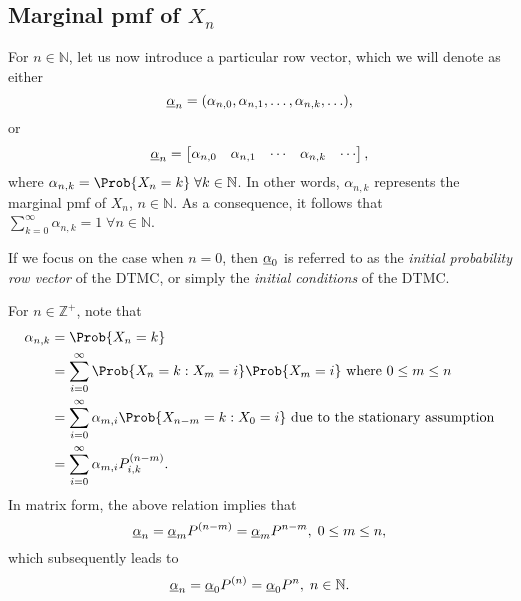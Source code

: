 \subsection*{Marginal pmf of $ X_n $}
\begin{Regular}
    For $ n\in\mathbb{N} $, let us now introduce a particular row vector, which we will denote as either
    \[ \underline{\alpha}_n=(\alpha_{n,0},\alpha_{n,1},\ldots,\alpha_{n,k},\ldots), \]
    or
    \[ \underline{\alpha}_n=\begin{bmatrix}
            \alpha_{n,0} & \alpha_{n,1} & \cdots & \alpha_{n,k} & \cdots
        \end{bmatrix}, \]
    where $ \alpha_{n,k}=\Prob{X_n=k}\; \forall k\in\mathbb{N} $. In other words, $ \alpha_{n,k} $ represents the marginal pmf of $ X_n $,
    $ n\in\mathbb{N} $. As a consequence, it follows that $ \sum_{k=0}^{\infty} \alpha_{n,k}=1\;\forall n\in\mathbb{N} $.

    If we focus on the case when $ n=0 $, then $ \underline{\alpha}_0 $ is referred to as the \emph{initial probability row vector}
    of the DTMC, or simply the \emph{initial conditions} of the DTMC\@.

    For $ n\in\mathbb{Z}^+ $, note that
    \begin{align*}
        \alpha_{n, k} & =\Prob{X_{n}=k}                                                                                            \\
                      & =\sum_{i=0}^{\infty} \Prob{X_{n}=k \given X_{m}=i} \Prob{X_{m}=i} \text{ where } 0 \leq m \leq n           \\
                      & =\sum_{i=0}^{\infty} \alpha_{m,i} \Prob{X_{n-m}=k \given X_{0}=i} \text{ due to the stationary assumption} \\
                      & =\sum_{i=0}^{\infty} \alpha_{m,i} P_{i,k}^{(n-m)}.
    \end{align*}
    In matrix form, the above relation implies that
    \[ \underline{\alpha}_{n}=\underline{\alpha}_{m} P^{(n-m)}=\underline{\alpha}_{m} P^{n-m},\; 0 \leq m \leq n, \]
    which subsequently leads to
    \[ \underline{\alpha}_n=\underline{\alpha}_0P^{(n)}=\underline{\alpha}_0P^{n},\; n\in\mathbb{N}. \]
\end{Regular}
